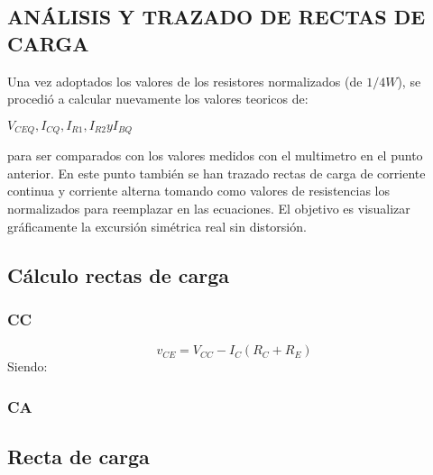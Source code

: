 \begin{multicols}{2}
\section{ANÁLISIS Y TRAZADO DE RECTAS DE CARGA}
        \sangria{} Una vez adoptados los valores de los resistores normalizados (de $1/4 W$), se procedió a calcular nuevamente los valores teoricos de:
        \begin{center}
            $V_{CEQ}, I_{CQ}, I_{R1}, I_{R2} y I_{BQ}$
        \end{center}
        para ser comparados con los valores medidos con el multimetro en el punto anterior.
        \sangria{} En este punto también se han trazado rectas de carga de corriente continua y corriente alterna tomando como valores de resistencias los normalizados para reemplazar en las ecuaciones. El objetivo es visualizar gráficamente la excursión simétrica real sin distorsión.

        \subsection{Cálculo rectas de carga}
        \subsubsection{CC}
        \[
        v_{CE} = V_{CC} - I_C (R_C + R_E)
        \]
        Siendo:


        \subsubsection{CA}
\end{multicols}

\subsection{Recta de carga}

